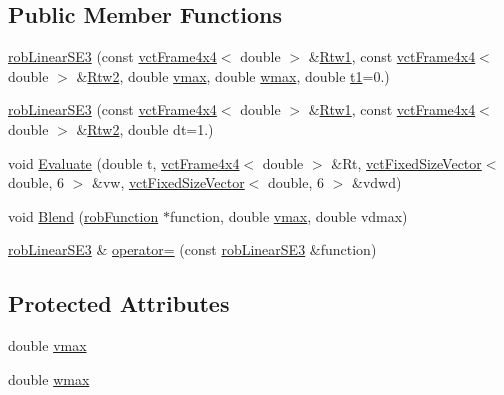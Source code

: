 \subsection*{Public Member Functions}
\begin{DoxyCompactItemize}
\item 
\hyperlink{classrob_linear_s_e3_aed2db77d51c20263461718f0f636e235}{rob\-Linear\-S\-E3} (const \hyperlink{classvct_frame4x4}{vct\-Frame4x4}$<$ double $>$ \&\hyperlink{classrob_function_s_e3_a16c18215d20446f2bd11e7f54ace81a6}{Rtw1}, const \hyperlink{classvct_frame4x4}{vct\-Frame4x4}$<$ double $>$ \&\hyperlink{classrob_function_s_e3_a06d362ebf89c4f6a3984c4097a810a27}{Rtw2}, double \hyperlink{classrob_linear_s_e3_a581ce540523b540cfcfb8619e5deb792}{vmax}, double \hyperlink{classrob_linear_s_e3_a691b0ddc307e875576d62f8e05762c1f}{wmax}, double \hyperlink{classrob_function_a9a4b408a3a5a8ae927caec3b6bac36ef}{t1}=0.)
\item 
\hyperlink{classrob_linear_s_e3_ade3248991253db8fecb41ba5a93a357c}{rob\-Linear\-S\-E3} (const \hyperlink{classvct_frame4x4}{vct\-Frame4x4}$<$ double $>$ \&\hyperlink{classrob_function_s_e3_a16c18215d20446f2bd11e7f54ace81a6}{Rtw1}, const \hyperlink{classvct_frame4x4}{vct\-Frame4x4}$<$ double $>$ \&\hyperlink{classrob_function_s_e3_a06d362ebf89c4f6a3984c4097a810a27}{Rtw2}, double dt=1.)
\item 
void \hyperlink{classrob_linear_s_e3_a569a3f137c16299a0de3f722ad06fdec}{Evaluate} (double t, \hyperlink{classvct_frame4x4}{vct\-Frame4x4}$<$ double $>$ \&Rt, \hyperlink{classvct_fixed_size_vector}{vct\-Fixed\-Size\-Vector}$<$ double, 6 $>$ \&vw, \hyperlink{classvct_fixed_size_vector}{vct\-Fixed\-Size\-Vector}$<$ double, 6 $>$ \&vdwd)
\item 
void \hyperlink{classrob_linear_s_e3_aaa90a72d6f596fcfce394017e5d86908}{Blend} (\hyperlink{classrob_function}{rob\-Function} $\ast$function, double \hyperlink{classrob_linear_s_e3_a581ce540523b540cfcfb8619e5deb792}{vmax}, double vdmax)
\item 
\hyperlink{classrob_linear_s_e3}{rob\-Linear\-S\-E3} \& \hyperlink{classrob_linear_s_e3_a016af98cbc9f4997d2ddc000dd8704ba}{operator=} (const \hyperlink{classrob_linear_s_e3}{rob\-Linear\-S\-E3} \&function)
\end{DoxyCompactItemize}
\subsection*{Protected Attributes}
\begin{DoxyCompactItemize}
\item 
double \hyperlink{classrob_linear_s_e3_a581ce540523b540cfcfb8619e5deb792}{vmax}
\item 
double \hyperlink{classrob_linear_s_e3_a691b0ddc307e875576d62f8e05762c1f}{wmax}
\end{DoxyCompactItemize}


